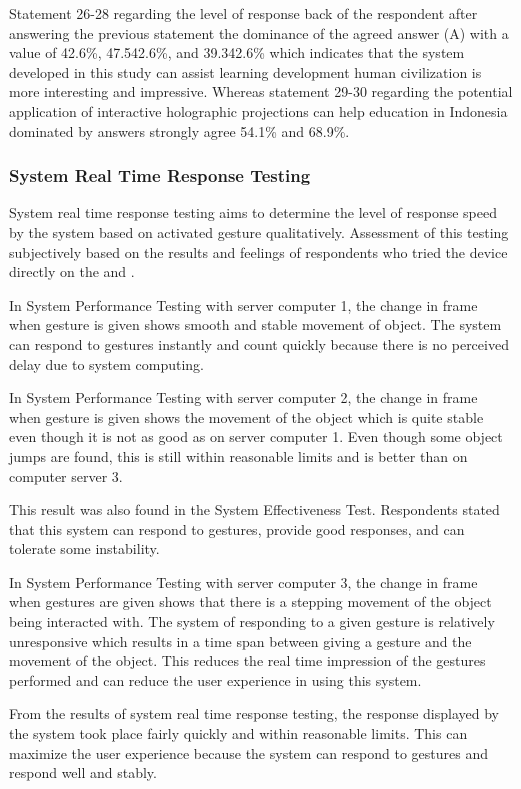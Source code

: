 \documentclass[conference]{IEEEtran}
\begin{document}
			Statement 26-28 regarding the level of response back of the respondent after answering the previous statement the dominance of the agreed answer (A) with a value of 42.6\%, 47.542.6\%, and 39.342.6\% which indicates that the system developed in this study can assist learning development human civilization is more interesting and impressive. Whereas statement 29-30 regarding the potential application of interactive holographic projections can help education in Indonesia dominated by answers strongly agree 54.1\% and 68.9\%.
			
		\subsubsection{System Real Time Response Testing}
			System real time response testing aims to determine the level of response speed by the system based on activated gesture qualitatively. Assessment of this testing subjectively based on the results and feelings of respondents who tried the device directly on the  and .
			
			In System Performance Testing with server computer 1, the change in frame when gesture is given shows smooth and stable movement of object. The system can respond to gestures instantly and count quickly because there is no perceived delay due to system computing.
			
			In System Performance Testing with server computer 2, the change in frame when gesture is given shows the movement of the object which is quite stable even though it is not as good as on server computer 1. Even though some object jumps are found, this is still within reasonable limits and is better than on computer server 3.
			
			This result was also found in the System Effectiveness Test. Respondents stated that this system can respond to gestures, provide good responses, and can tolerate some instability.
			
			In System Performance Testing with server computer 3, the change in frame when gestures are given shows that there is a stepping movement of the object being interacted with. The system of responding to a given gesture is relatively unresponsive which results in a time span between giving a gesture and the movement of the object. This reduces the real time impression of the gestures performed and can reduce the user experience in using this system.
			
			From the results of system real time response testing, the response displayed by the system took place fairly quickly and within reasonable limits. This can maximize the user experience because the system can respond to gestures and respond well and stably.
		
\end{document}

